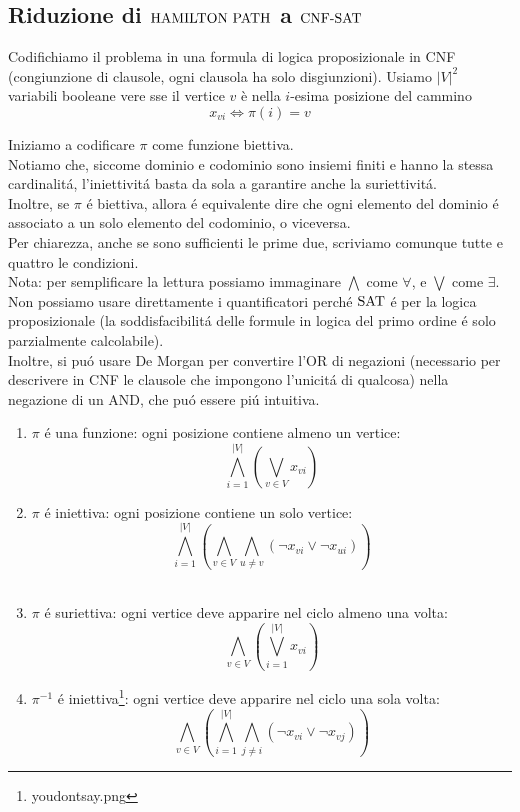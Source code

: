 \subsection{Riduzione di $\text{HAMILTON PATH}$ a $\text{CNF-SAT}$}
\label{riduzione:hamiltonpath_sat}
Codifichiamo il problema in una formula di logica proposizionale in CNF (congiunzione di clausole, ogni clausola ha solo disgiunzioni).
Usiamo $|V|^2$ variabili booleane vere sse il vertice $v$ è nella $i$-esima posizione del cammino
\[x_{vi} \iff \pi(i) = v\]

Iniziamo a codificare $\pi$ come funzione biettiva. \\
Notiamo che, siccome dominio e codominio sono insiemi finiti e hanno la stessa cardinalitá, l'iniettivitá basta da sola a garantire anche la suriettivitá. \\
Inoltre, se $\pi$ é biettiva, allora é equivalente dire che ogni elemento del dominio é associato a un solo elemento del codominio, o viceversa. \\
Per chiarezza, anche se sono sufficienti le prime due, scriviamo comunque tutte e quattro le condizioni. \\

Nota: per semplificare la lettura possiamo immaginare $\bigwedge$ come $\forall$, e $\bigvee$ come $\exists$.
Non possiamo usare direttamente i quantificatori perché $\text{SAT}$ é per la logica proposizionale 
(la soddisfacibilitá delle formule in logica del primo ordine é solo parzialmente calcolabile). \\ 

Inoltre, si puó usare De Morgan per convertire l'OR di negazioni (necessario per descrivere in CNF le clausole che impongono l'unicitá di qualcosa) nella negazione di un AND, che puó essere piú intuitiva.\\

\begin{enumerate}
    \item $\pi$ é una funzione: ogni posizione contiene almeno un vertice:\\
    \[\bigwedge_{i=1}^{|V|} \left( \bigvee_{v \in V} x_{vi} \right)\]
    \item $\pi$ é iniettiva: ogni posizione contiene un solo vertice:\\
    \[\bigwedge_{i=1}^{|V|} \left( \bigwedge_{v \in V} \bigwedge_{u \neq v} (\neg x_{vi} \lor \neg x_{ui}) \right)\] \\
\item $\pi$ é suriettiva: ogni vertice deve apparire nel ciclo almeno una volta:\\
    \[\bigwedge_{v \in V} \left( \bigvee_{i=1}^{|V|} x_{vi} \right)\]
    \item $\pi^{-1}$ é iniettiva\footnote{youdontsay.png}: ogni vertice deve apparire nel ciclo una sola volta:\\
    \[\bigwedge_{v \in V} \left( \bigwedge_{i=1}^{|V|} \bigwedge_{j \neq i} (\neg x_{vi} \lor \neg x_{vj}) \right)\]
\end{enumerate}

